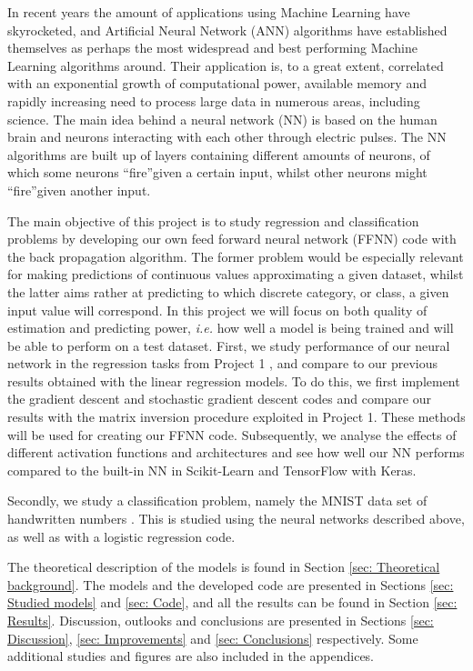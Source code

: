 \documentclass{emulateapj}
\begin{document}
In recent years the amount of applications using Machine Learning have skyrocketed, and Artificial Neural Network (ANN) algorithms have established themselves as perhaps the most widespread and best performing Machine Learning algorithms around. Their application is, to a great extent, correlated with an exponential growth of computational power, available memory and rapidly increasing need to process large data in numerous areas, including science. The main idea behind a neural network (NN) is based on the human brain and neurons interacting with each other through electric pulses. The NN algorithms are built up of layers containing different amounts of neurons, of which some neurons \textquotedblleft fire\textquotedblright given a certain input, whilst other neurons might \textquotedblleft fire\textquotedblright given another input.  

The main objective of this project is to study regression and classification problems by developing our own feed forward neural network (FFNN) code with the back propagation algorithm. The former problem would be especially relevant for making predictions of continuous values approximating a given dataset, whilst the latter aims rather at predicting to which discrete category, or class, a given input value will correspond. In this project we will focus on both quality of estimation and predicting power, \textit{i.e.} how well a model is being trained and will be able to perform on a test dataset. First, we study performance of our neural network in the regression tasks from Project 1 \cite{proj1, proj1_2}, and compare to our previous results obtained with the linear regression models. To do this, we first implement the gradient descent and stochastic gradient descent codes and compare our results with the matrix inversion procedure exploited in Project 1. These methods will be used for creating our FFNN code. Subsequently, we analyse the effects of different activation functions and architectures and see how well our NN performs compared to the built-in NN in Scikit-Learn and TensorFlow with Keras.

Secondly, we study a classification problem, namely the MNIST data set of handwritten numbers \cite{MNIST}. This is studied using the neural networks described above, as well as with a logistic regression code.

The theoretical description of the models is found in Section \ref{sec: Theoretical background}. The models and the developed code are presented in Sections \ref{sec: Studied models} and \ref{sec: Code}, and all the results can be found in Section \ref{sec: Results}. Discussion, outlooks and conclusions are presented in Sections \ref{sec: Discussion}, \ref{sec: Improvements} and \ref{sec: Conclusions} respectively. Some additional studies and figures are also included in the appendices.
\end{document}
